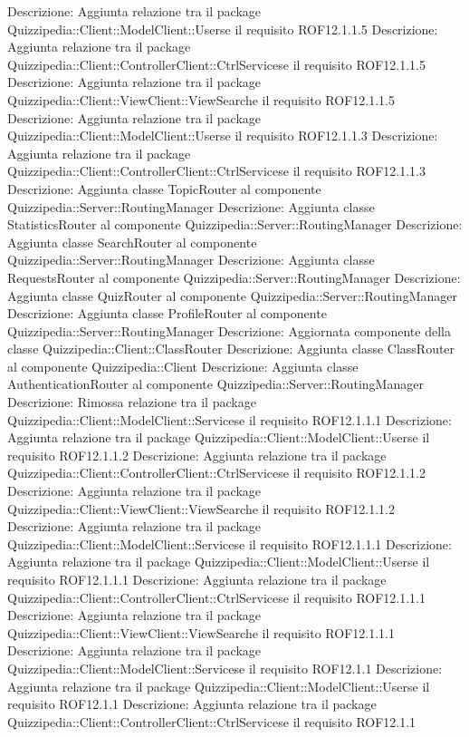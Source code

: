 Descrizione: Aggiunta relazione tra il package Quizzipedia::Client::ModelClient::Userse il requisito ROF12.1.1.5 
Descrizione: Aggiunta relazione tra il package Quizzipedia::Client::ControllerClient::CtrlServicese il requisito ROF12.1.1.5 
Descrizione: Aggiunta relazione tra il package Quizzipedia::Client::ViewClient::ViewSearche il requisito ROF12.1.1.5 
Descrizione: Aggiunta relazione tra il package Quizzipedia::Client::ModelClient::Userse il requisito ROF12.1.1.3 
Descrizione: Aggiunta relazione tra il package Quizzipedia::Client::ControllerClient::CtrlServicese il requisito ROF12.1.1.3 
Descrizione: Aggiunta classe TopicRouter al componente Quizzipedia::Server::RoutingManager 
Descrizione: Aggiunta classe StatisticsRouter al componente Quizzipedia::Server::RoutingManager 
Descrizione: Aggiunta classe SearchRouter al componente Quizzipedia::Server::RoutingManager 
Descrizione: Aggiunta classe RequestsRouter al componente Quizzipedia::Server::RoutingManager 
Descrizione: Aggiunta classe QuizRouter al componente Quizzipedia::Server::RoutingManager 
Descrizione: Aggiunta classe ProfileRouter al componente Quizzipedia::Server::RoutingManager 
Descrizione: Aggiornata componente della classe Quizzipedia::Client::ClassRouter 
Descrizione: Aggiunta classe ClassRouter al componente Quizzipedia::Client 
Descrizione: Aggiunta classe AuthenticationRouter al componente Quizzipedia::Server::RoutingManager 
Descrizione: Rimossa relazione tra il package Quizzipedia::Client::ModelClient::Servicese il requisito ROF12.1.1.1 
Descrizione: Aggiunta relazione tra il package Quizzipedia::Client::ModelClient::Userse il requisito ROF12.1.1.2 
Descrizione: Aggiunta relazione tra il package Quizzipedia::Client::ControllerClient::CtrlServicese il requisito ROF12.1.1.2 
Descrizione: Aggiunta relazione tra il package Quizzipedia::Client::ViewClient::ViewSearche il requisito ROF12.1.1.2 
Descrizione: Aggiunta relazione tra il package Quizzipedia::Client::ModelClient::Servicese il requisito ROF12.1.1.1 
Descrizione: Aggiunta relazione tra il package Quizzipedia::Client::ModelClient::Userse il requisito ROF12.1.1.1 
Descrizione: Aggiunta relazione tra il package Quizzipedia::Client::ControllerClient::CtrlServicese il requisito ROF12.1.1.1 
Descrizione: Aggiunta relazione tra il package Quizzipedia::Client::ViewClient::ViewSearche il requisito ROF12.1.1.1 
Descrizione: Aggiunta relazione tra il package Quizzipedia::Client::ModelClient::Servicese il requisito ROF12.1.1 
Descrizione: Aggiunta relazione tra il package Quizzipedia::Client::ModelClient::Userse il requisito ROF12.1.1 
Descrizione: Aggiunta relazione tra il package Quizzipedia::Client::ControllerClient::CtrlServicese il requisito ROF12.1.1 
